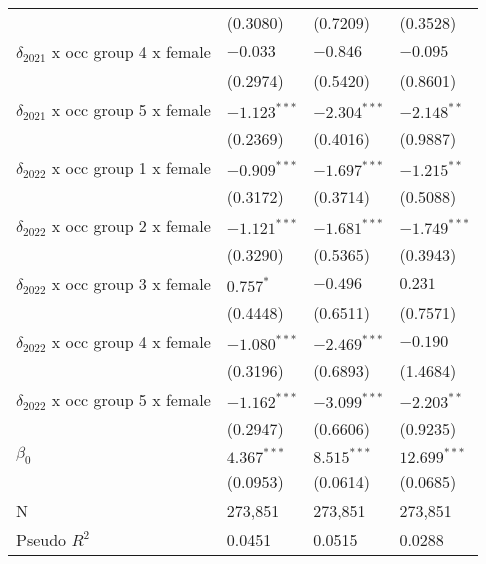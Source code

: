 \begin{tabular}{llll}
                                       &           (0.3080) &           (0.7209) &           (0.3528) \\
$\delta_{2021}$ x occ group 4 x female &           $-0.033$ &           $-0.846$ &           $-0.095$ \\
                                       &           (0.2974) &           (0.5420) &           (0.8601) \\
$\delta_{2021}$ x occ group 5 x female &     $-1.123^{***}$ &     $-2.304^{***}$ &      $-2.148^{**}$ \\
                                       &           (0.2369) &           (0.4016) &           (0.9887) \\
$\delta_{2022}$ x occ group 1 x female &     $-0.909^{***}$ &     $-1.697^{***}$ &      $-1.215^{**}$ \\
                                       &           (0.3172) &           (0.3714) &           (0.5088) \\
$\delta_{2022}$ x occ group 2 x female &     $-1.121^{***}$ &     $-1.681^{***}$ &     $-1.749^{***}$ \\
                                       &           (0.3290) &           (0.5365) &           (0.3943) \\
$\delta_{2022}$ x occ group 3 x female &          $0.757^*$ &           $-0.496$ &            $0.231$ \\
                                       &           (0.4448) &           (0.6511) &           (0.7571) \\
$\delta_{2022}$ x occ group 4 x female &     $-1.080^{***}$ &     $-2.469^{***}$ &           $-0.190$ \\
                                       &           (0.3196) &           (0.6893) &           (1.4684) \\
$\delta_{2022}$ x occ group 5 x female &     $-1.162^{***}$ &     $-3.099^{***}$ &      $-2.203^{**}$ \\
                                       &           (0.2947) &           (0.6606) &           (0.9235) \\
$\beta_0$                              &      $4.367^{***}$ &      $8.515^{***}$ &     $12.699^{***}$ \\
                                       &           (0.0953) &           (0.0614) &           (0.0685) \\
N                                      &            273,851 &            273,851 &            273,851 \\
Pseudo $R^2$                           &             0.0451 &             0.0515 &             0.0288 \\
\bottomrule
\end{tabular}

